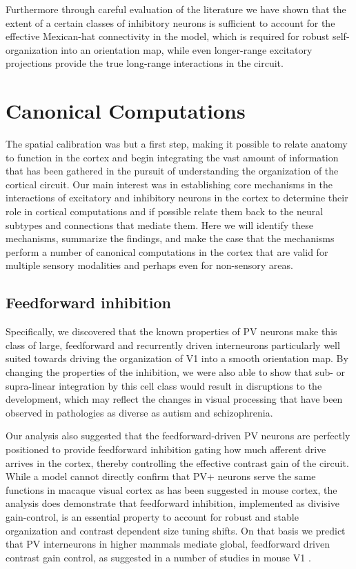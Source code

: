 Furthermore through careful evaluation of the literature we have shown
that the extent of a certain classes of inhibitory neurons is
sufficient to account for the effective Mexican-hat connectivity in
the model, which is required for robust self-organization into an
orientation map, while even longer-range excitatory projections
provide the true long-range interactions in the circuit.

\section{Canonical Computations}

The spatial calibration was but a first step, making it possible to
relate anatomy to function in the cortex and begin integrating the
vast amount of information that has been gathered in the pursuit of
understanding the organization of the cortical circuit. Our main
interest was in establishing core mechanisms in the interactions of
excitatory and inhibitory neurons in the cortex to determine their
role in cortical computations and if possible relate them back to the
neural subtypes and connections that mediate them. Here we will
identify these mechanisms, summarize the findings, and make the case
that the mechanisms perform a number of canonical computations in the
cortex that are valid for multiple sensory modalities and perhaps even
for non-sensory areas.

\subsection{Feedforward inhibition}

Specifically, we discovered that the known properties of PV neurons
make this class of large, feedforward and recurrently driven
interneurons particularly well suited towards driving the organization
of V1 into a smooth orientation map. By changing the properties of the
inhibition, we were also able to show that sub- or supra-linear
integration by this cell class would result in disruptions to the
development, which may reflect the changes in visual processing that
have been observed in pathologies as diverse as autism and
schizophrenia.

Our analysis also suggested that the feedforward-driven PV neurons are
perfectly positioned to provide feedforward inhibition gating how much
afferent drive arrives in the cortex, thereby controlling the effective
contrast gain of the circuit. While a model cannot directly confirm
that PV+ neurons serve the same functions in macaque visual cortex as
has been suggested in mouse cortex, the analysis does demonstrate that
feedforward inhibition, implemented as divisive gain-control, is an
essential property to account for robust and stable organization and
contrast dependent size tuning shifts. On that basis we predict that
PV interneurons in higher mammals mediate global, feedforward driven
contrast gain control, as suggested in a number of studies in mouse V1
\citep{Ma2010, Atallah2012, Wilson2012, Nienborg2013}.

